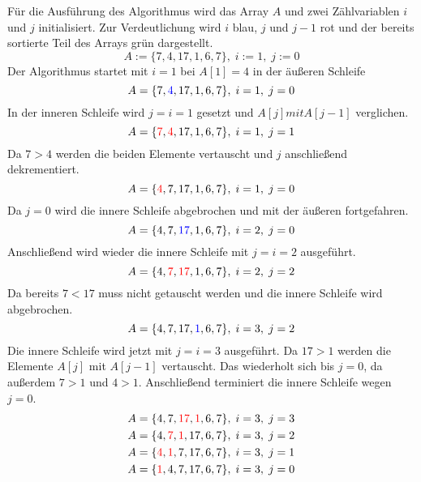 \noindent
Für die Ausführung des Algorithmus wird das Array $A$ und zwei Zählvariablen $i$ und $j$ initialisiert. Zur Verdeutlichung wird $i$ blau, $j$ und $j-1$ rot und der bereits sortierte Teil des Arrays grün dargestellt.
\begin{equation*}
	A := \{7, 4, 17, 1, 6, 7\},\;i:=1,\;j:=0
\end{equation*}
\noindent
Der Algorithmus startet mit $i=1$ bei $A[1] = 4$ in der äußeren Schleife
\begin{equation*}
	A = \{7, \textcolor{blue}{4}, 17, 1, 6, 7\},\;i = 1,\;j=0 \\
\end{equation*}
\noindent
In der inneren Schleife wird $j = i = 1$ gesetzt und  $A[j] mit A[j - 1]$ verglichen.
\begin{equation*}
	A = \{\textcolor{red}{7}, \textcolor{red}{4}, 17, 1, 6, 7\},\;i = 1,\;j=1 \\
\end{equation*}
\noindent
Da $7 > 4$ werden die beiden Elemente vertauscht und $j$ anschließend dekrementiert.
\begin{equation*}
	A = \{\textcolor{red}{4}, 7, 17, 1, 6, 7\},\;i = 1,\;j=0 \\
\end{equation*}
\noindent
Da $j=0$ wird die innere Schleife abgebrochen und mit der äußeren fortgefahren.
\begin{equation*}
	A = \{4, 7, \textcolor{blue}{17}, 1, 6, 7\},\;i = 2,\;j=0 \\
\end{equation*}
\noindent
Anschließend wird wieder die innere Schleife mit $j=i=2$ ausgeführt.
\begin{equation*}
	A = \{4, \textcolor{red}{7}, \textcolor{red}{17}, 1, 6, 7\},\;i = 2,\;j=2 \\
\end{equation*}
\noindent
Da bereits $7 < 17$ muss nicht getauscht werden und die innere Schleife wird abgebrochen.
\begin{equation*}
	A = \{4, 7, 17, \textcolor{blue}{1}, 6, 7\},\;i = 3,\;j=2 \\
\end{equation*}
\noindent
Die innere Schleife wird jetzt mit $j=i=3$ ausgeführt. Da $17 > 1$ werden die Elemente $A[j]$ mit $A[j-1]$ vertauscht. Das wiederholt sich bis $j=0$, da außerdem $7 > 1$ und $4>1$. Anschließend terminiert die innere Schleife wegen $j=0$.
\begin{equation*}
	\begin{split}
		A = \{4, 7,  \textcolor{red}{17}, \textcolor{red}{1}, 6, 7\},\;i = 3,\;j=3 \\
		A = \{4, \textcolor{red}{7},  \textcolor{red}{1}, 17, 6, 7\},\;i = 3,\;j=2 \\
		A = \{\textcolor{red}{4}, \textcolor{red}{1},  7, 17, 6, 7\},\;i = 3,\;j=1 \\
		A = \{\textcolor{red}{1}, 4,  7, 17, 6, 7\},\;i = 3,\;j=0 \\
	\end{split}
\end{equation*}
